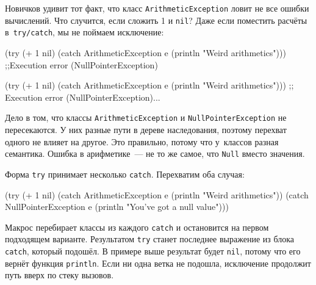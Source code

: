 Новичков удивит тот факт, что класс \texttt{ArithmeticException} ловит не все
ошибки вычислений. Что случится, если сложить 1 и \verb|nil|? Даже если
поместить расчёты в~\verb|try/catch|, мы не поймаем исключение:

\ifx\DEVICETYPE\MOBILE

\begin{english}
  \begin{clojure}
(try
  (+ 1 nil)
  (catch ArithmeticException e
    (println "Weird arithmetics")))
;;Execution error (NullPointerException)
  \end{clojure}
\end{english}

\else

\begin{english}
  \begin{clojure}
(try
  (+ 1 nil)
  (catch ArithmeticException e
    (println "Weird arithmetics")))
;; Execution error (NullPointerException)...
  \end{clojure}
\end{english}

\fi


Дело в том, что классы \texttt{ArithmeticException} и
\texttt{NullPointerException} не пересекаются. У них разные пути в дереве
наследования, поэтому перехват одного не влияет на другое. Это правильно, потому
что у~классов разная семантика. Ошибка в арифметике~--- не то же самое, что
\verb|Null| вместо значения.


Форма \verb|try| принимает несколько \verb|catch|. Перехватим оба случая:

\begin{english}
  \begin{clojure}
(try
  (+ 1 nil)
  (catch ArithmeticException e
    (println "Weird arithmetics"))
  (catch NullPointerException e
    (println "You've got a null value")))
  \end{clojure}
\end{english}

Макрос перебирает классы из каждого \verb|catch| и остановится на первом
подходящем варианте. Результатом \verb|try| станет последнее выражение из блока
\verb|catch|, который подошёл. В примере выше результат будет \verb|nil|, потому
что его вернёт функция \verb|println|. Если ни одна ветка не подошла, исключение
продолжит путь вверх по стеку вызовов.

